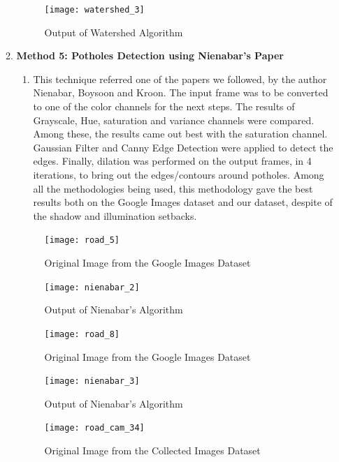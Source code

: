 \begin{enumerate}
\begin{enumerate}
    \begin{figure}[ht!]
        \centering
        \texttt{[image: watershed\_3]}
        \caption{Output of Watershed Algorithm}
    \end{figure}
    \pagebreak
    
    \item \textbf{Method 5: Potholes Detection using Nienabar's Paper}
    \begin{enumerate}
        \item This technique referred one of the papers we followed, by the author Nienabar, Boysoon and Kroon. The input frame was to be converted to one of the color channels for the next steps. The results of Grayscale, Hue, saturation and variance channels were compared. Among these, the results came out best with the saturation channel. Gaussian Filter and Canny Edge Detection were applied to detect the edges. Finally, dilation was performed on the output frames, in 4 iterations, to bring out the edges/contours around potholes.
        Among all the methodologies being used, this methodology gave the best results both on the Google Images dataset and our dataset, despite of the shadow and illumination setbacks.
    \end{enumerate}
    \begin{figure}[ht!]
        \centering
        \texttt{[image: road\_5]}
        \caption{Original Image from the Google Images Dataset}
    \end{figure}

    \begin{figure}[ht!]
        \centering
        \texttt{[image: nienabar\_2]}
        \caption{Output of Nienabar's Algorithm}
    \end{figure}
    \pagebreak
    
    \begin{figure}[ht!]
        \centering
        \texttt{[image: road\_8]}
        \caption{Original Image from the Google Images Dataset}
    \end{figure}

    \begin{figure}[ht!]
        \centering
        \texttt{[image: nienabar\_3]}
        \caption{Output of Nienabar's Algorithm}
    \end{figure}
    \pagebreak
    
    \begin{figure}[ht!]
        \centering
        \texttt{[image: road\_cam\_34]}
        \caption{Original Image from the Collected Images Dataset}
    \end{figure}


\end{enumerate}
\end{enumerate}
